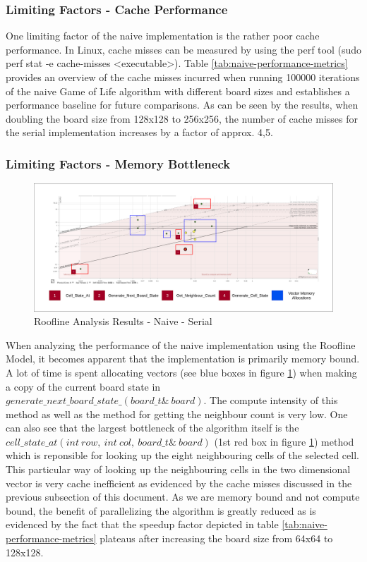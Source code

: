 \documentclass[a4paper,english,12pt,twoside=false]{scrartcl} %
\begin{document}
\subsubsection{Limiting Factors - Cache Performance}

One limiting factor of the naive implementation is the rather poor cache performance. In Linux, cache misses can be measured by using the perf tool (sudo perf stat -e cache-misses <executable>). Table \ref{tab:naive-performance-metrics} provides an overview of the cache misses incurred when running 100000 iterations of the naive Game of Life algorithm with different board sizes and establishes a performance baseline for future comparisons. As can be seen by the results, when doubling the board size from 128x128 to 256x256, the number of cache misses for the serial implementation increases by a factor of approx. 4,5. 

\subsubsection{Limiting Factors - Memory Bottleneck}

\begin{figure}[tbh!]
	\centering
	\includegraphics[width=16cm]{imgs/roofline-naive-32-100k.png}
	\caption{Roofline Analysis Results - Naive - Serial}
	\label{fig:roofline-naive-32-100k}
\end{figure}

When analyzing the performance of the naive implementation using the Roofline Model, it becomes apparent that the implementation is primarily memory bound. A lot of time is spent allocating vectors (see blue boxes in figure \ref{fig:roofline-naive-32-100k}) when making a copy of the current board state in $generate{\_}next{\_}board{\_}state{\_}(board{\_}t{\&}{\ }board)$. The compute intensity of this method as well as the method for getting the neighbour count is very low. One can also see that the largest bottleneck of the algorithm itself is the $cell{\_}state{\_}at(int{\ }row,{\ }int{\ }col,{\ }board{\_}t{\&}{\ } board)$ (1st red box in figure \ref{fig:roofline-naive-32-100k}) method which is reponsible for looking up the eight neighbouring cells of the selected cell. This particular way of looking up the neighbouring cells in the two dimensional vector is very cache inefficient as evidenced by the cache misses discussed in the previous subsection of this document. As we are memory bound and not compute bound, the benefit of parallelizing the algorithm is greatly reduced as is evidenced by the fact that the speedup factor depicted in table \ref{tab:naive-performance-metrics} plateaus after increasing the board size from 64x64 to 128x128. 
\end{document}
